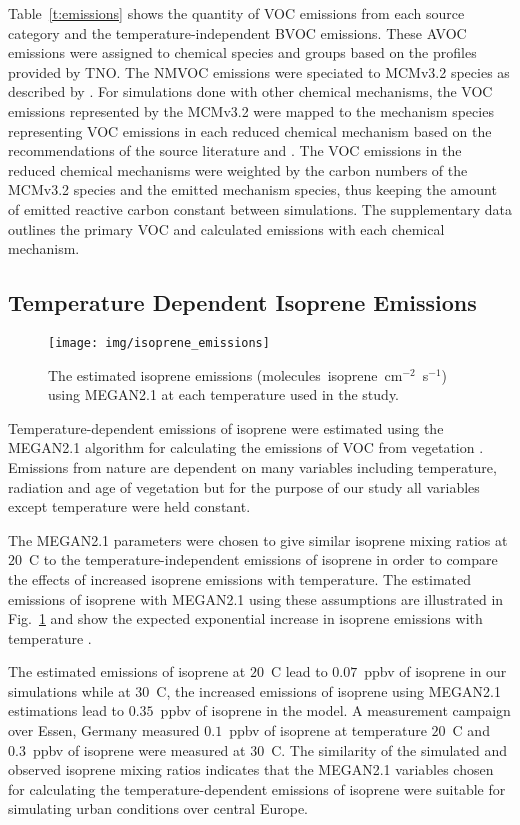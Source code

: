 Table~\ref{t:emissions} shows the quantity of VOC emissions from each source category and the temperature-independent BVOC emissions.
These AVOC emissions were assigned to chemical species and groups based on the profiles provided by TNO.
The NMVOC emissions were speciated to MCMv3.2 species as described by \citet{vonSchneidemesser:2016}.
For simulations done with other chemical mechanisms, the VOC emissions represented by the MCMv3.2 were mapped to the mechanism species representing VOC emissions in each reduced chemical mechanism based on the recommendations of the source literature and \citet{Carter:2015}.
The VOC emissions in the reduced chemical mechanisms were weighted by the carbon numbers of the MCMv3.2 species and the emitted mechanism species, thus keeping the amount of emitted reactive carbon constant between simulations. 
The supplementary data outlines the primary VOC and calculated emissions with each chemical mechanism.

\subsection{Temperature Dependent Isoprene Emissions} \label{ss:megan}
\begin{figure}[t]%
    \centering%
    \caption{The estimated isoprene emissions (molecules~isoprene~cm$^{-2}$~s$^{-1}$) using MEGAN2.1 at each temperature used in the study.}
    \label{f:isoprene_emissions}%
    \texttt{[image: img/isoprene\_emissions]}
\end{figure}
Temperature-dependent emissions of isoprene were estimated using the MEGAN2.1 algorithm for calculating the emissions of VOC from vegetation \citep{Guenther:2012}.
Emissions from nature are dependent on many variables including temperature, radiation and age of vegetation but for the purpose of our study all variables except temperature were held constant.

The MEGAN2.1 parameters were chosen to give similar isoprene mixing ratios at $20$~\degree C to the temperature-independent emissions of isoprene in order to compare the effects of increased isoprene emissions with temperature.
The estimated emissions of isoprene with MEGAN2.1 using these assumptions are illustrated in Fig.~\ref{f:isoprene_emissions} and show the expected exponential increase in isoprene emissions with temperature \citep{Guenther:2006}.

The estimated emissions of isoprene at $20$~\degree C lead to $0.07$~ppbv of isoprene in our simulations while at $30$~\degree C, the increased emissions of isoprene using MEGAN2.1 estimations lead to $0.35$~ppbv of isoprene in the model.
A measurement campaign over Essen, Germany \citep{Wagner:2014} measured $0.1$~ppbv of isoprene at temperature $20$~\degree C and $0.3$~ppbv of isoprene were measured at $30$~\degree C.
The similarity of the simulated and observed isoprene mixing ratios indicates that the MEGAN2.1 variables chosen for calculating the temperature-dependent emissions of isoprene were suitable for simulating urban conditions over central Europe.
